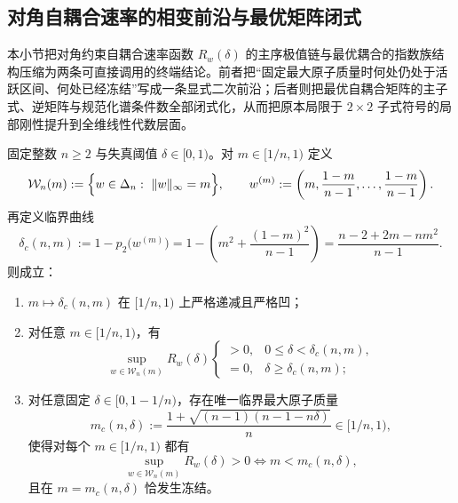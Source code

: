 \subsection{对角自耦合速率的相变前沿与最优矩阵闭式}\label{subsec:conclusion-diagonal-rate-phasefront-optimal-coupling-closedform}
本小节把对角约束自耦合速率函数 \(R_w(\delta)\) 的主序极值链与最优耦合的指数族结构压缩为两条可直接调用的终端结论。前者把“固定最大原子质量时何处仍处于活跃区间、何处已经冻结”写成一条显式二次前沿；后者则把最优自耦合矩阵的主子式、逆矩阵与规范化谱条件数全部闭式化，从而把原本局限于 \(2\times2\) 子式符号的局部刚性提升到全维线性代数层面。

\begin{theorem}[固定最大原子质量的活跃区间具有显式相变前沿]\label{thm:conclusion-diagonal-rate-maxatom-phasefront}
固定整数 \(n\ge 2\) 与失真阈值 \(\delta\in[0,1)\)。对 \(m\in[1/n,1)\) 定义
\[
\mathcal W_n(m):=\Bigl\{w\in\Delta_n:\ \|w\|_\infty=m\Bigr\},
\qquad
w^{(m)}:=\left(m,\frac{1-m}{n-1},\dots,\frac{1-m}{n-1}\right).
\]
再定义临界曲线
\[
\delta_c(n,m)
:=
1-p_2\!\bigl(w^{(m)}\bigr)
=
1-\left(m^2+\frac{(1-m)^2}{n-1}\right)
=
\frac{n-2+2m-nm^2}{n-1}.
\]
则成立：
\begin{enumerate}
  \item \(m\mapsto \delta_c(n,m)\) 在 \([1/n,1)\) 上严格递减且严格凹；
  \item 对任意 \(m\in[1/n,1)\)，有
  \[
  \sup_{w\in\mathcal W_n(m)}R_w(\delta)
  \begin{cases}
  >0,& 0\le \delta<\delta_c(n,m),\\[3pt]
  =0,& \delta\ge \delta_c(n,m);
  \end{cases}
  \]
  \item 对任意固定 \(\delta\in[0,1-1/n)\)，存在唯一临界最大原子质量
  \[
  m_c(n,\delta):=\frac{1+\sqrt{(n-1)(n-1-n\delta)}}{n}\in[1/n,1),
  \]
  使得对每个 \(m\in[1/n,1)\) 都有
  \[
  \sup_{w\in\mathcal W_n(m)}R_w(\delta)>0
  \iff
  m<m_c(n,\delta),
  \]
  且在 \(m=m_c(n,\delta)\) 恰发生冻结。
\end{enumerate}
\end{theorem}
